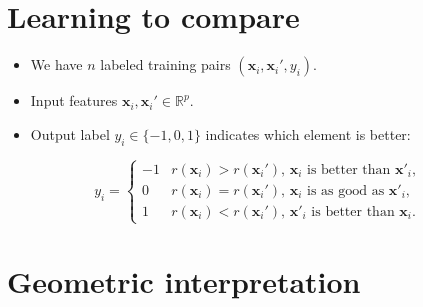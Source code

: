 \documentclass[twocolumn]{article}
\newcommand{\RR}{\mathbb R}
\begin{document}
\section*{Learning to compare}
\begin{itemize}
\item We have $n$ labeled training pairs $(\mathbf x_i, \mathbf x_i', y_i)$.
\item Input features $\mathbf x_i,\mathbf x_i'\in\RR^p$.
\item Output label $y_i\in\{-1,0,1\}$ indicates which element is
  better:
\end{itemize}
\begin{equation*}
  \label{eq:z}
  y_i =
  \begin{cases}
    -1 &  r(\mathbf x_i)>r(\mathbf x_i')
    \text{, $\mathbf x_i$ is better than $\mathbf x'_i$},\\
    0 & r(\mathbf x_i) = r(\mathbf x_i')
    \text{, $\mathbf x_i$ is as good as $\mathbf x'_i$},\\
    1 & r(\mathbf x_i)<r(\mathbf x_i')
    \text{, $\mathbf x'_i$ is better than $\mathbf x_i$}.
  \end{cases}
\end{equation*}

\section*{Geometric interpretation}


\end{document}
